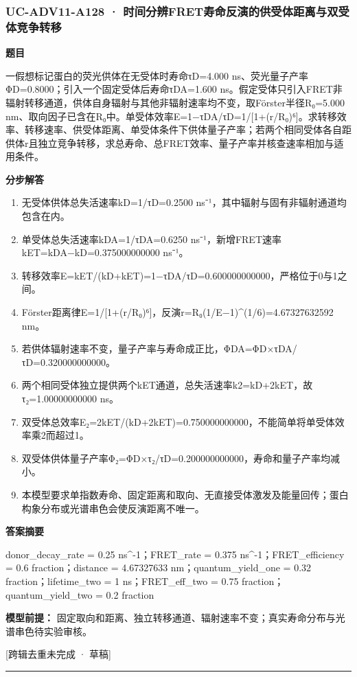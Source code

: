 \documentclass[UTF8,11pt,a4paper]{ctexart}
\begin{document}
\subsubsection*{UC-ADV11-A128 · 时间分辨FRET寿命反演的供受体距离与双受体竞争转移}
\noindent\textbf{题目}\par
一假想标记蛋白的荧光供体在无受体时寿命τD=4.000 ns、荧光量子产率ΦD=0.8000；引入一个固定受体后寿命τDA=1.600 ns。假定受体只引入FRET非辐射转移通道，供体自身辐射与其他非辐射速率均不变，取Förster半径R₀=5.000 nm、取向因子已含在R₀中。单受体效率E=1−τDA/τD=1/[1+(r/R₀)⁶]。求转移效率、转移速率、供受体距离、单受体条件下供体量子产率；若两个相同受体各自距供体r且独立竞争转移，求总寿命、总FRET效率、量子产率并核查速率相加与适用条件。\par
\medskip\noindent\textbf{分步解答}
\begin{enumerate}
\item 无受体供体总失活速率kD=1/τD=0.2500 ns⁻¹，其中辐射与固有非辐射通道均包含在内。
\item 单受体总失活速率kDA=1/τDA=0.6250 ns⁻¹，新增FRET速率kET=kDA−kD=0.375000000000 ns⁻¹。
\item 转移效率E=kET/(kD+kET)=1−τDA/τD=0.600000000000，严格位于0与1之间。
\item Förster距离律E=1/[1+(r/R₀)⁶]，反演r=R₀(1/E−1)\textasciicircum{}(1/6)=4.67327632592 nm。
\item 若供体辐射速率不变，量子产率与寿命成正比，ΦDA=ΦD×τDA/τD=0.320000000000。
\item 两个相同受体独立提供两个kET通道，总失活速率k2=kD+2kET，故τ₂=1.00000000000 ns。
\item 双受体总效率E₂=2kET/(kD+2kET)=0.750000000000，不能简单将单受体效率乘2而超过1。
\item 双受体供体量子产率Φ₂=ΦD×τ₂/τD=0.200000000000，寿命和量子产率均减小。
\item 本模型要求单指数寿命、固定距离和取向、无直接受体激发及能量回传；蛋白构象分布或光谱串色会使反演距离不唯一。
\end{enumerate}
\noindent\textbf{答案摘要}\par
donor\_decay\_rate = 0.25 ns\textasciicircum{}-1；FRET\_rate = 0.375 ns\textasciicircum{}-1；FRET\_efficiency = 0.6 fraction；distance = 4.67327633 nm；quantum\_yield\_one = 0.32 fraction；lifetime\_two = 1 ns；FRET\_eff\_two = 0.75 fraction；quantum\_yield\_two = 0.2 fraction\par
\noindent\textbf{模型前提：}
固定取向和距离、独立转移通道、辐射速率不变；真实寿命分布与光谱串色待实验审核。\par
\noindent\textcolor{red!65!black}{[跨辑去重未完成 · 草稿]} \par
\medskip\hrule\medskip
{}
\end{document}
